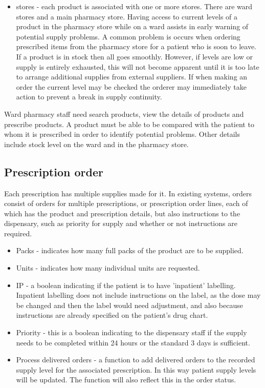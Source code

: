 \documentclass[letterpaper]{amsart}
\begin{document}
\begin{itemize}
    \item stores - each product is associated with one or more stores.  There are ward stores and a main pharmacy store.  Having access to current levels of a product in the pharmacy store while on a ward assists in early warning of potential supply problems.  A common problem is occurs when ordering prescribed items from the pharmacy store for a patient who is soon to leave.  If a product is in stock then all goes smoothly.  However, if levels are low or supply is entirely exhausted, this will not become apparent until it is too late to arrange additional supplies from external suppliers.  If when making an order the current level may be checked the orderer may immediately take action to prevent a break in supply continuity.  
\end{itemize}

Ward pharmacy staff need search products, view the details of products and prescribe products.  A product must be able to be compared with the patient to whom it is prescribed in order to identify potential problems.  Other details include stock level on the ward and in the pharmacy store.
\subsection{Prescription order}
Each prescription has multiple supplies made for it.  In existing systems, orders consist of orders for multiple prescriptions, or prescription order lines, each of which has the product and prescription details, but also instructions to the dispensary, such as priority for supply and whether or not instructions are required.
\begin{itemize}
    \item Packs - indicates how many full packs of the product are to be supplied. 
    \item Units - indicates how many individual units are requested. 
    \item IP - a boolean indicating if the patient is to have 'inpatient' labelling.  Inpatient labelling does not include instructions on the label, as the dose may be changed and then the label would need adjustment, and also because instructions are already specified on the patient's drug chart. 
    \item Priority - this is a boolean indicating to the dispensary staff if the supply needs to be completed within 24 hours or the standard 3 days is sufficient. 
    \item Process delivered orders - a function to add delivered orders to the recorded supply level for the associated prescription.  In this way patient supply levels will be updated.  The function will also reflect this in the order status.
\end{itemize}
\end{document}
